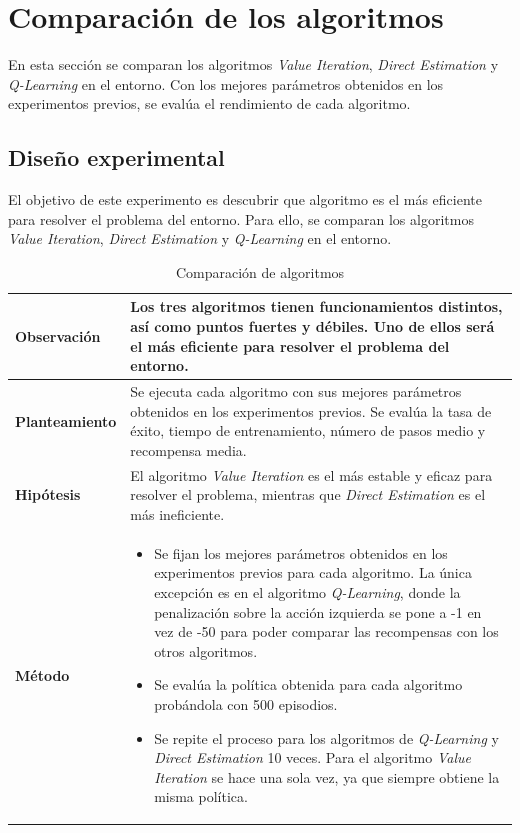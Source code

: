 \section{Comparación de los algoritmos}

En esta sección se comparan los algoritmos \textit{Value Iteration}, \textit{Direct Estimation} y \textit{Q-Learning} en el entorno. Con los mejores parámetros obtenidos en los experimentos previos, se evalúa el rendimiento de cada algoritmo.

\subsection{Diseño experimental}

El objetivo de este experimento es descubrir que algoritmo es el más eficiente para resolver el problema del entorno. Para ello, se comparan los algoritmos \textit{Value Iteration}, \textit{Direct Estimation} y \textit{Q-Learning} en el entorno.

\begin{table}[H]
    \centering
    \begin{tabularx}{\textwidth}{|p{4cm}|X|} %
        \hline %
        \textbf{Observación} & Los tres algoritmos tienen funcionamientos distintos, así como puntos fuertes y débiles. Uno de ellos será el más eficiente para resolver el problema del entorno.
        \\ \hline
        \textbf{Planteamiento} & Se ejecuta cada algoritmo con sus mejores parámetros obtenidos en los experimentos previos. Se evalúa la tasa de éxito, tiempo de entrenamiento, número de pasos medio y recompensa media.
        \\ \hline
        \textbf{Hipótesis} & El algoritmo \textit{Value Iteration} es el más estable y eficaz para resolver el problema, mientras que \textit{Direct Estimation} es el más ineficiente.
        \\ \hline
        \textbf{Método} & 
        \begin{itemize}
            \item Se fijan los mejores parámetros obtenidos en los experimentos previos para cada algoritmo. La única excepción es en el algoritmo \textit{Q-Learning}, donde la penalización sobre la acción izquierda se pone a -1 en vez de -50 para poder comparar las recompensas con los otros algoritmos.
            \item Se evalúa la política obtenida para cada algoritmo probándola con 500 episodios.
            \item Se repite el proceso para los algoritmos de \textit{Q-Learning} y \textit{Direct Estimation} 10 veces. Para el algoritmo \textit{Value Iteration} se hace una sola vez, ya que siempre obtiene la misma política.
        \end{itemize}
        \\ \hline
    \end{tabularx}
    \caption{Comparación de algoritmos}
    \label{tab:algorithmComparisonExp}
\end{table}

